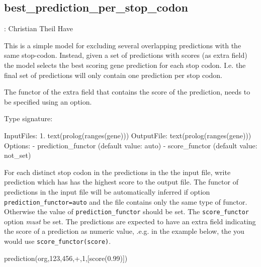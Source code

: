 


\subsection{best_prediction_per_stop_codon}

\label{sec:bestpredictionperstopcodon}

\begin{tags}
: Christian Theil Have
\end{tags}

This is a simple model for excluding several overlapping predictions
with the same stop-codon. Instead, given a set of predictions with
scores (as extra field) the model selects the best scoring gene prediction
for each stop codon.
I.e. the final set of predictions will only contain one prediction per
stop codon.

The functor of the extra field that contains the score of the prediction, needs
to be specified using an option.\vspace{0.7cm}

\begin{description}
Type signature:

\begin{code}
InputFiles:
    1. text(prolog(ranges(gene)))
OutputFile:
    text(prolog(ranges(gene)))
Options:
    - prediction_functor (default value: auto)
    - score_functor (default value: not_set)
\end{code}

For each distinct stop codon in the predictions in the the input file, write prediction which has has the highest
score to the output file.
The functor of predictions in the input file will be automatically inferred if option \verb$prediction_functor=auto$ and the file contains only the same type of functor. Otherwise the value of \verb$prediction_functor$ should be set.
The \verb$score_functor$ option \textit{must} be set. The predictions are expected to have an extra field indicating the score of a prediction as numeric value, .e.g. in the example below, the you would use \verb$score_functor(score)$.

\begin{code}
prediction(org,123,456,+,1,[score(0.99)])
\end{code}

\end{description}


